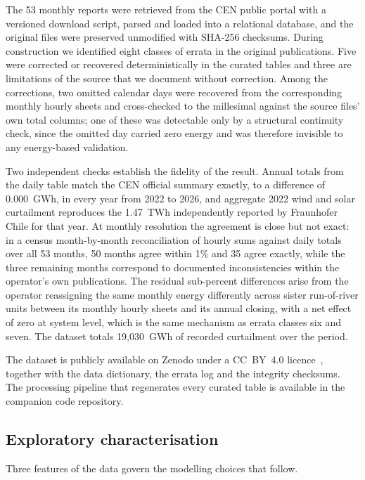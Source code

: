 \documentclass[preprint,3p,times]{elsarticle}
\begin{document}
The 53 monthly reports were retrieved from the CEN public portal with a versioned download script, parsed and loaded into a relational database, and the original files were preserved unmodified with SHA-256 checksums. During construction we identified eight classes of errata in the original publications. Five were corrected or recovered deterministically in the curated tables and three are limitations of the source that we document without correction. Among the corrections, two omitted calendar days were recovered from the corresponding monthly hourly sheets and cross-checked to the millesimal against the source files' own total columns; one of these was detectable only by a structural continuity check, since the omitted day carried zero energy and was therefore invisible to any energy-based validation.

Two independent checks establish the fidelity of the result. Annual totals from the daily table match the CEN official summary exactly, to a difference of 0.000~GWh, in every year from 2022 to 2026, and aggregate 2022 wind and solar curtailment reproduces the 1.47~TWh independently reported by Fraunhofer Chile for that year. At monthly resolution the agreement is close but not exact: in a census month-by-month reconciliation of hourly sums against daily totals over all 53 months, 50 months agree within 1\% and 35 agree exactly, while the three remaining months correspond to documented inconsistencies within the operator's own publications. The residual sub-percent differences arise from the operator reassigning the same monthly energy differently across sister run-of-river units between its monthly hourly sheets and its annual closing, with a net effect of zero at system level, which is the same mechanism as errata classes six and seven. The dataset totals 19{,}030~GWh of recorded curtailment over the period.

The dataset is publicly available on Zenodo under a CC~BY~4.0 licence~\cite{dataset2026}, together with the data dictionary, the errata log and the integrity checksums. The processing pipeline that regenerates every curated table is available in the companion code repository.

\subsection{Exploratory characterisation}
\label{sec:eda}

Three features of the data govern the modelling choices that follow.
\end{document}
